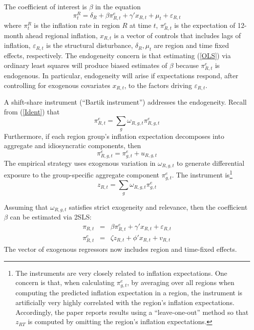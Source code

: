 \documentclass[12pt]{article}
\begin{document}
The coefficient of interest is $\beta$ in the equation
\begin{equation}\label{OLS}
 \pi^R_t = \delta_R + \beta \pi^e_{R,t} + \gamma'x_{R,t} + \mu_t + \varepsilon_{R,t}
\end{equation}
where $\pi^R_t$ is the inflation rate in region $R$ at time $t$, $\pi^e_{R,t}$ is the expectation of 12-month ahead regional inflation, $x_{R,t}$ is a vector of controls that includes lags of inflation, $\varepsilon_{R,t}$ is the structural disturbance, $\delta_R, \mu_t$ are region and time fixed effects, respectively. The endogeneity concern is that estimating (\ref{OLS}) via ordinary least squares will produce biased estimates of $\beta$ because $\pi^e_{R,t}$ is endogenous. In particular, endogeneity will arise if expectations respond, after controlling for exogenous covariates $x_{R,t}$, to the factors driving $\varepsilon_{R,t}$.

A shift-share instrument (``Bartik instrument'') addresses the endogeneity. Recall from (\ref{Ident}) that 
$$ \pi^e_{R,t} = \sum_{g}\omega_{R,g,t}\pi^e_{R,g,t}$$
Furthermore, if each region group's inflation expectation decomposes into aggregate and idiosyncratic components, then
$$ \pi^e_{R,g,t} = \pi^e_{g,t} + u_{R,g,t}$$
The empirical strategy uses exogenous variation in $\omega_{R,g,t}$ to generate differential exposure to the group-specific aggregate component $\pi^e_{g,t}$. The instrument is\footnote{The instruments are very closely related to inflation expectations. One concern is that, when calculating $\pi^e_{g,t}$, by averaging over all regions when computing the predicted inflation expectation in a region, the instrument is artificially very highly correlated with the region's inflation expectations. Accordingly, the paper reports results using a ``leave-one-out'' method so that $z_{RT}$ is computed by omitting the region's inflation expectations.}
$$ z_{R,t} = \sum_g \omega_{R,g,t} \pi^e_{g,t}$$

Assuming that $\omega_{R,g,t}$ satisfies strict exogeneity and relevance, then the coefficient $\beta$ can be estimated via 2SLS:
\begin{eqnarray}\label{2SLS}
\pi_{R,t} & = & \beta \pi^e_{R,t} + \gamma'x_{R,t} + \varepsilon_{R,t}\\
\pi^e_{R,t} &=& \zeta z_{R,t} + \phi' x_{R,t} + v_{R,t}
\end{eqnarray}
The vector of exogenous regressors now includes region and time-fixed effects.
\end{document}
